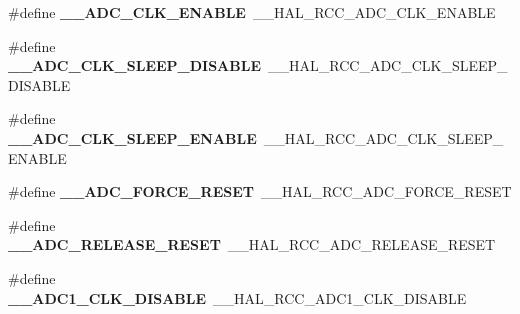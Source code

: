 \begin{DoxyCompactItemize}
\item 
\#define {\bfseries \+\_\+\+\_\+\+A\+D\+C\+\_\+\+C\+L\+K\+\_\+\+E\+N\+A\+B\+LE}~\+\_\+\+\_\+\+H\+A\+L\+\_\+\+R\+C\+C\+\_\+\+A\+D\+C\+\_\+\+C\+L\+K\+\_\+\+E\+N\+A\+B\+LE\hypertarget{group___h_a_l___r_c_c___aliased_ga3c9e07dfc357910bdd8241d83e1ab404}{}\label{group___h_a_l___r_c_c___aliased_ga3c9e07dfc357910bdd8241d83e1ab404}

\item 
\#define {\bfseries \+\_\+\+\_\+\+A\+D\+C\+\_\+\+C\+L\+K\+\_\+\+S\+L\+E\+E\+P\+\_\+\+D\+I\+S\+A\+B\+LE}~\+\_\+\+\_\+\+H\+A\+L\+\_\+\+R\+C\+C\+\_\+\+A\+D\+C\+\_\+\+C\+L\+K\+\_\+\+S\+L\+E\+E\+P\+\_\+\+D\+I\+S\+A\+B\+LE\hypertarget{group___h_a_l___r_c_c___aliased_gaea979d2b065299f4699d49fbf7dc1162}{}\label{group___h_a_l___r_c_c___aliased_gaea979d2b065299f4699d49fbf7dc1162}

\item 
\#define {\bfseries \+\_\+\+\_\+\+A\+D\+C\+\_\+\+C\+L\+K\+\_\+\+S\+L\+E\+E\+P\+\_\+\+E\+N\+A\+B\+LE}~\+\_\+\+\_\+\+H\+A\+L\+\_\+\+R\+C\+C\+\_\+\+A\+D\+C\+\_\+\+C\+L\+K\+\_\+\+S\+L\+E\+E\+P\+\_\+\+E\+N\+A\+B\+LE\hypertarget{group___h_a_l___r_c_c___aliased_gac919ab7c7218c3d5be119a7a66727cf8}{}\label{group___h_a_l___r_c_c___aliased_gac919ab7c7218c3d5be119a7a66727cf8}

\item 
\#define {\bfseries \+\_\+\+\_\+\+A\+D\+C\+\_\+\+F\+O\+R\+C\+E\+\_\+\+R\+E\+S\+ET}~\+\_\+\+\_\+\+H\+A\+L\+\_\+\+R\+C\+C\+\_\+\+A\+D\+C\+\_\+\+F\+O\+R\+C\+E\+\_\+\+R\+E\+S\+ET\hypertarget{group___h_a_l___r_c_c___aliased_gac2ca60c797339b8fb2407e1cd19268b7}{}\label{group___h_a_l___r_c_c___aliased_gac2ca60c797339b8fb2407e1cd19268b7}

\item 
\#define {\bfseries \+\_\+\+\_\+\+A\+D\+C\+\_\+\+R\+E\+L\+E\+A\+S\+E\+\_\+\+R\+E\+S\+ET}~\+\_\+\+\_\+\+H\+A\+L\+\_\+\+R\+C\+C\+\_\+\+A\+D\+C\+\_\+\+R\+E\+L\+E\+A\+S\+E\+\_\+\+R\+E\+S\+ET\hypertarget{group___h_a_l___r_c_c___aliased_ga2d1f1b26b6536e9c64d5aadc3477166b}{}\label{group___h_a_l___r_c_c___aliased_ga2d1f1b26b6536e9c64d5aadc3477166b}

\item 
\#define {\bfseries \+\_\+\+\_\+\+A\+D\+C1\+\_\+\+C\+L\+K\+\_\+\+D\+I\+S\+A\+B\+LE}~\+\_\+\+\_\+\+H\+A\+L\+\_\+\+R\+C\+C\+\_\+\+A\+D\+C1\+\_\+\+C\+L\+K\+\_\+\+D\+I\+S\+A\+B\+LE\hypertarget{group___h_a_l___r_c_c___aliased_ga6506d98e0a44a0fd83fc893acdea24b6}{}\label{group___h_a_l___r_c_c___aliased_ga6506d98e0a44a0fd83fc893acdea24b6}


\end{DoxyCompactItemize}
